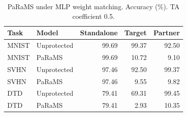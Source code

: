 \begin{table}[t]
\centering\small
\caption{PaRaMS under MLP weight matching. Accuracy (\%). TA coefficient 0.5.}
\label{tab:params-mlp-matching}
\begin{tabular}{llrrr}
\toprule
Task & Model & Standalone & Target & Partner \\
\midrule
MNIST & Unprotected & 99.69 & 99.37 & 92.50 \\
MNIST & PaRaMS & 99.69 & 10.72 & 9.10 \\
SVHN & Unprotected & 97.46 & 92.50 & 99.37 \\
SVHN & PaRaMS & 97.46 & 9.55 & 9.82 \\
DTD & Unprotected & 79.41 & 69.31 & 99.45 \\
DTD & PaRaMS & 79.41 & 2.93 & 10.35 \\
\bottomrule
\end{tabular}
\end{table}

